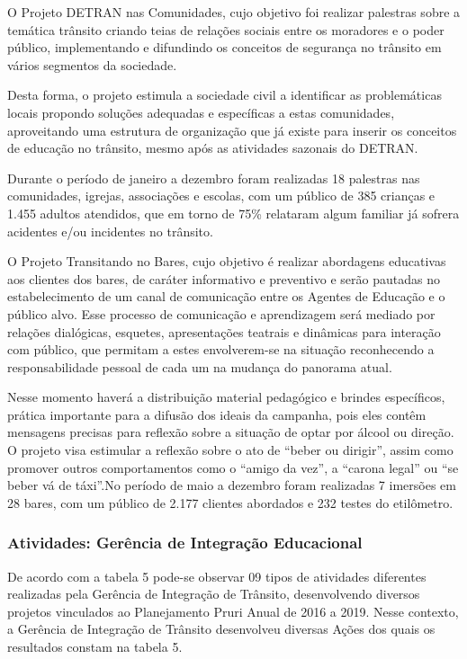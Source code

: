 \documentclass[a4paper]{article}
\begin{document}
O Projeto DETRAN nas Comunidades, cujo objetivo foi realizar palestras sobre a temática trânsito criando teias de relações sociais entre os moradores e o poder público, implementando e difundindo os conceitos de segurança no trânsito em vários segmentos da sociedade.
\vskip0.3cm

Desta forma, o projeto estimula a sociedade civil a identificar as problemáticas locais propondo soluções adequadas e específicas a estas comunidades, aproveitando uma estrutura de organização que já existe para inserir os conceitos de educação no trânsito, mesmo após as atividades sazonais do DETRAN.
\vskip0.3cm

Durante o período de janeiro a dezembro foram realizadas 18 palestras nas comunidades, igrejas, associações e escolas, com um público de 385 crianças e 1.455 adultos atendidos, que em torno de 75\% relataram algum familiar já sofrera acidentes e/ou incidentes no trânsito.\vskip0.3cm


O Projeto Transitando no Bares, cujo objetivo é realizar abordagens educativas aos clientes dos bares, de caráter informativo e preventivo e serão pautadas no estabelecimento de um canal de comunicação entre os Agentes de Educação e o público alvo. Esse processo de comunicação e aprendizagem será mediado por relações dialógicas, esquetes, apresentações teatrais e dinâmicas para interação com público, que permitam a estes envolverem-se na situação reconhecendo a responsabilidade pessoal de cada um na mudança do panorama atual. 
\vskip0.3cm

Nesse momento haverá a distribuição material pedagógico e brindes específicos, prática importante para a difusão dos ideais da campanha, pois eles contêm mensagens precisas para reflexão sobre a situação de optar por álcool ou direção. O projeto visa estimular a reflexão sobre o ato de “beber ou dirigir”, assim como promover outros comportamentos como o “amigo da vez”, a “carona legal” ou “se beber vá de táxi”.No período de maio a dezembro foram realizadas 7 imersões em 28 bares, com um público de 2.177 clientes abordados e 232 testes do etilômetro.\vskip0.3cm


\subsubsection{Atividades: Gerência de Integração Educacional}

De acordo com a tabela 5 pode-se observar 09 tipos de atividades diferentes realizadas pela Gerência de Integração de Trânsito, desenvolvendo diversos projetos vinculados ao Planejamento Pruri Anual de 2016 a 2019. Nesse contexto, a Gerência de Integração de Trânsito desenvolveu diversas Ações dos quais os resultados constam na tabela 5.\vskip0.3cm
\end{document}
